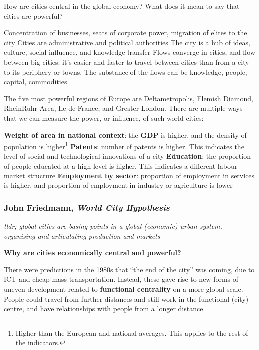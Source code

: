 \documentclass{article}
\begin{document}
How are cities central in the global economy? What does it mean to say that cities are powerful? 

\begin{outline}
	\1 Concentration of businesses, seats of corporate power, migration of elites to the city
	\1 Cities are administrative and political authorities
	\1 The city is a hub of ideas, culture, social influence, and knowledge transfer
	\1 Flows converge in cities, and flow between big cities: it's easier and faster to travel between cities than from a city to its periphery or towns. The substance of the flows can be knowledge, people, capital, commodities
\end{outline}

The five most powerful regions of Europe are Deltametropolis, Flemish Diamond, RheinRuhr Area, Ile-de-France, and Greater London.
There are multiple ways that we can measure the power, or influence, of such world-cities:

\begin{outline}
	\1 \textbf{Weight of area in national context}: the \textbf{GDP} is higher, and the density of population is higher\footnote{Higher than the European and national averages. This applies to the rest of the indicators.}
	\1 \textbf{Patents}: number of patents is higher. This indicates the level of social and technological innovations of a city
	\1 \textbf{Education}: the proportion of people educated at a high level is higher. This indicates a different labour market structure
	\1 \textbf{Employment by sector}: proportion of employment in services is higher, and proportion of employment in industry or agriculture is lower
\end{outline}

\subsubsection{John Friedmann, \textit{World City Hypothesis}}

\textit{tldr; global cities are basing points in a global (economic) urban system, organising and articulating production and markets}

\textbf{Why are cities economically central and powerful?}

There were predictions in the 1980s that ``the end of the city'' was coming, due to ICT and cheap mass transportation. Instead, these gave rise to new forms of uneven development related to \textbf{functional centrality} on a more global scale. People could travel from further distances and still work in the functional (city) centre, and have relationships with people from a longer distance.
\end{document}
